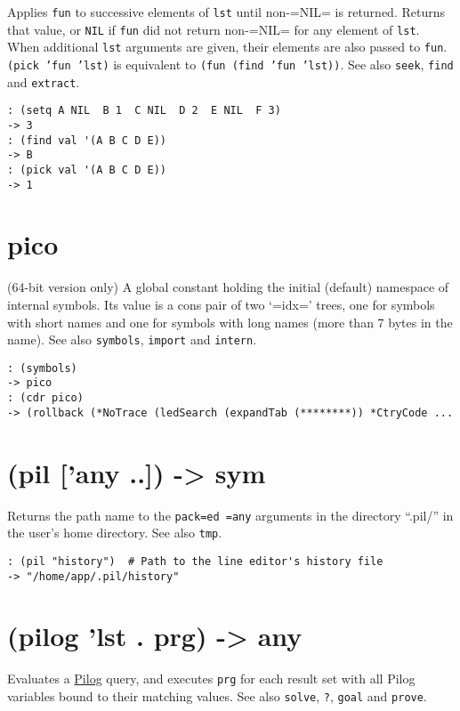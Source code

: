 {{{{{{{Applies \texttt{fun} to successive elements of \texttt{lst} until non-=NIL= is
returned. Returns that value, or \texttt{NIL} if \texttt{fun} did not return non-=NIL=
for any element of \texttt{lst}. When additional \texttt{lst} arguments are given,
their elements are also passed to \texttt{fun}. \texttt{(pick 'fun 'lst)} is
equivalent to \texttt{(fun (find 'fun 'lst))}. See also \texttt{seek}, \texttt{find} and
\texttt{extract}.


\begin{verbatim}
: (setq A NIL  B 1  C NIL  D 2  E NIL  F 3)
-> 3
: (find val '(A B C D E))
-> B
: (pick val '(A B C D E))
-> 1
\end{verbatim}

 
\section{pico}
\label{sec-8-1-16-15}


(64-bit version only) A global constant holding the initial (default)
namespace of internal symbols. Its value is a cons pair of two `=idx='
trees, one for symbols with short names and one for symbols with long
names (more than 7 bytes in the name). See also \texttt{symbols}, \texttt{import} and
\texttt{intern}.


\begin{verbatim}
: (symbols)
-> pico
: (cdr pico)
-> (rollback (*NoTrace (ledSearch (expandTab (********)) *CtryCode ...
\end{verbatim}

 
\section{(pil ['any ..]) -> sym}
\label{sec-8-1-16-16}


Returns the path name to the \texttt{pack=ed =any} arguments in the directory
``.pil/'' in the user's home directory. See also \texttt{tmp}.


\begin{verbatim}
: (pil "history")  # Path to the line editor's history file
-> "/home/app/.pil/history"
\end{verbatim}

 
\section{(pilog 'lst . prg) -> any}
\label{sec-8-1-16-17}


Evaluates a \hyperref[ref.html-pilog]{Pilog} query, and executes \texttt{prg} for each
result set with all Pilog variables bound to their matching values. See
also \texttt{solve}, \texttt{?}, \texttt{goal} and \texttt{prove}.


}}}}}}}
